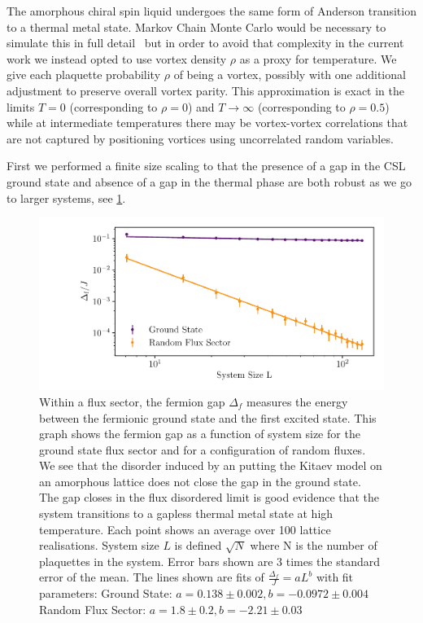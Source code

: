The amorphous chiral spin liquid undergoes the same form of Anderson transition to a thermal metal state. Markov Chain Monte Carlo would be necessary to simulate this in full detail~\autocite{selfThermallyInducedMetallic2019} but in order to avoid that complexity in the current work we instead opted to use vortex density \(\rho\) as a proxy for temperature. We give each plaquette probability \(\rho\) of being a vortex, possibly with one additional adjustment to preserve overall vortex parity. This approximation is exact in the limits \(T = 0\) (corresponding to \(\rho = 0\)) and \(T \to \infty\) (corresponding to \(\rho = 0.5\)) while at intermediate temperatures there may be vortex-vortex correlations that are not captured by positioning vortices using uncorrelated random variables.

First we performed a finite size scaling to that the presence of a gap in the CSL ground state and absence of a gap in the thermal phase are both robust as we go to larger systems, see \cref{fig:fermion_gap_vs_L}.

\hypertarget{fig:fermion_gap_vs_L}{%
\begin{figure}
\centering
\includegraphics[width=1\textwidth,height=\textheight]{figure_code/amk_chapter/results/fermion_gap_vs_L/fermion_gap_vs_L}
\caption[{Finite Size Scaing of the Fermion Gap}]{Within a flux sector, the fermion gap \(\Delta_f\) measures the energy between the fermionic ground state and the first excited state. This graph shows the fermion gap as a function of system size for the ground state flux sector and for a configuration of random fluxes. We see that the disorder induced by an putting the Kitaev model on an amorphous lattice does not close the gap in the ground state. The gap closes in the flux disordered limit is good evidence that the system transitions to a gapless thermal metal state at high temperature. Each point shows an average over 100 lattice realisations. System size \(L\) is defined \(\sqrt{N}\) where N is the number of plaquettes in the system. Error bars shown are \(3\) times the standard error of the mean. The lines shown are fits of \(\tfrac{\Delta_f}{J} = aL ^ b\) with fit parameters: Ground State: \(a = 0.138 \pm 0.002, b = -0.0972 \pm 0.004\) Random Flux Sector: \(a = 1.8 \pm 0.2, b = -2.21 \pm 0.03\)}
\label{fig:fermion_gap_vs_L}
\end{figure}
}

